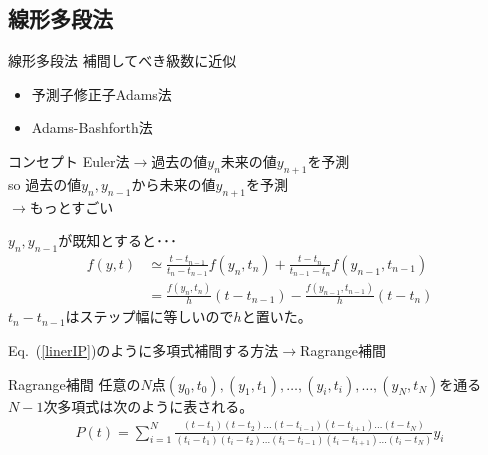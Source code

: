 \documentclass[unicode, 12pt, aspectratio=169]{beamer}
\newcommand{\eref}[1]{Eq.~(\ref{#1})}
\begin{document}
\subsection{線形多段法}
\frame{\insertsubsection}

\begin{frame}
  \begin{block}{線形多段法}
    補間してべき級数に近似
  \end{block}
    \begin{itemize}
      \item 予測子修正子Adams法
      \item Adams-Bashforth法
    \end{itemize}
    \begin{block}{コンセプト}
    Euler法$\rightarrow$過去の値$y_n$未来の値$y_{n+1}$を予測\\
      \alert{so} 過去の値$y_n, y_{n-1}$から未来の値$y_{n+1}$を予測\\
      $\rightarrow$もっとすごい
    \end{block}
\end{frame}

\begin{frame}
    $y_n,y_{n-1}$が既知とすると･･･
    \begin{align}
      f(y, t)
      &\simeq \frac{t-t_{n-1}}{t_n-t_{n-1}}f(y_n, t_n)+ \frac{t-t_{n}}{t_{n-1}-t_n}f(y_{n-1},t_{n-1}) \nonumber\\
      &=\frac{f(y_n,t_n)}{h}(t-t_{n-1}) - \frac{f(y_{n-1}, t_{n-1})}{h}(t-t_{n})\label{linerIP}
    \end{align}
    $t_n-t_{n-1}$はステップ幅に等しいので$h$と置いた。
\end{frame}

\begin{frame}
    \eref{linerIP}のように多項式補間する方法$\rightarrow$Ragrange補間
    \begin{block}{Ragrange補間}
      任意の$N$点$(y_0, t_0), (y_1, t_1),\dots ,(y_i,t_i),\dots ,(y_N,t_N)$を通る$N-1$次多項式は次のように表される。\\
      \begin{align}
        P(t) = \sum^{N}_{i=1}\frac{(t-t_1)(t-t_2)\dots(t-t_{i-1})(t-t_{i+1})\dots(t-t_N)}{(t_i-t_1)(t_i-t_2)\dots(t_i-t_{i-1})(t_i-t_{i+1})\dots(t_i-t_N)}y_i\label{Ragrange}
      \end{align}
    \end{block}
\end{frame}
\end{document}
